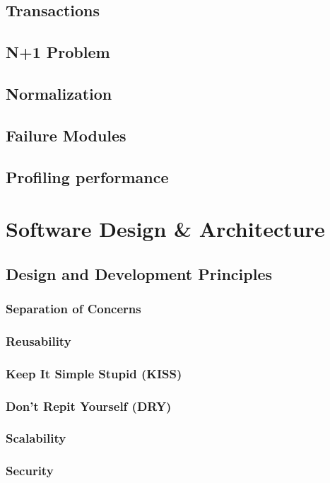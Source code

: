 \documentclass[a4paper]{article}
\begin{document}
    \subsection{Transactions}
    \subsection{N+1 Problem}
    \subsection{Normalization}
    \subsection{Failure Modules}
    \subsection{Profiling performance}
    
    
    \newpage
    \section{Software Design \& Architecture}
    \subsection{Design and Development Principles}
    \subsubsection{Separation of Concerns}
    \subsubsection{Reusability}
    \subsubsection{Keep It Simple Stupid (KISS)}
    \subsubsection{Don't Repit Yourself (DRY)}
    \subsubsection{Scalability}
    \subsubsection{Security}
\end{document}
